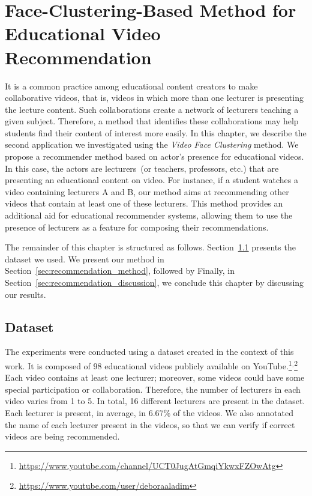 \newpage
\chapter{Face-Clustering-Based Method for Educational Video Recommendation}
\label{chap:educational_recommendation}

It is a common practice among educational content creators to make collaborative videos, that is, videos in which more than one lecturer is presenting the lecture content.
Such collaborations create a network of lecturers teaching a given subject.
Therefore, a method that identifies these collaborations may help students find their content of interest more easily.
In this chapter, we describe the second application we investigated using the \emph{Video Face Clustering} method.
We propose a recommender method based on actor's presence for educational videos. In this case, the actors are lecturers~(or teachers, professors, etc.) that are presenting an educational content on video.
For instance, if a student watches a video containing lecturers A and B, our method aims at recommending other videos that contain at least one of these lecturers. 
This method provides an additional aid for educational recommender systems, allowing them to use the presence of lecturers as a feature for composing their recommendations.

The remainder of this chapter is structured as follows.
Section~\ref{sec:recommendation_dataset} presents the dataset we used.
We present our method in Section~\ref{sec:recommendation_method}, followed by 
Finally, in Section~\ref{sec:recommendation_discussion}, we conclude this chapter by discussing our results.

\section{Dataset}
\label{sec:recommendation_dataset}

The experiments were conducted using a dataset created in the context of this work.
It is composed of 98 educational videos publicly available on YouTube.\footnote{\url{https://www.youtube.com/channel/UCT0JugAtGmqiYkwxFZOwAtg}}$^{,}$\footnote{\url{https://www.youtube.com/user/deboraaladim}}
Each video contains at least one lecturer; moreover, some videos could have some special participation or collaboration. Therefore, the number of lecturers in each video varies from 1 to 5. In total, 16 different lecturers are present in the dataset. Each lecturer is present, in average, in 6.67\% of the videos.
We also annotated the name of each lecturer present in the videos, so that we can verify if correct videos are being recommended.

